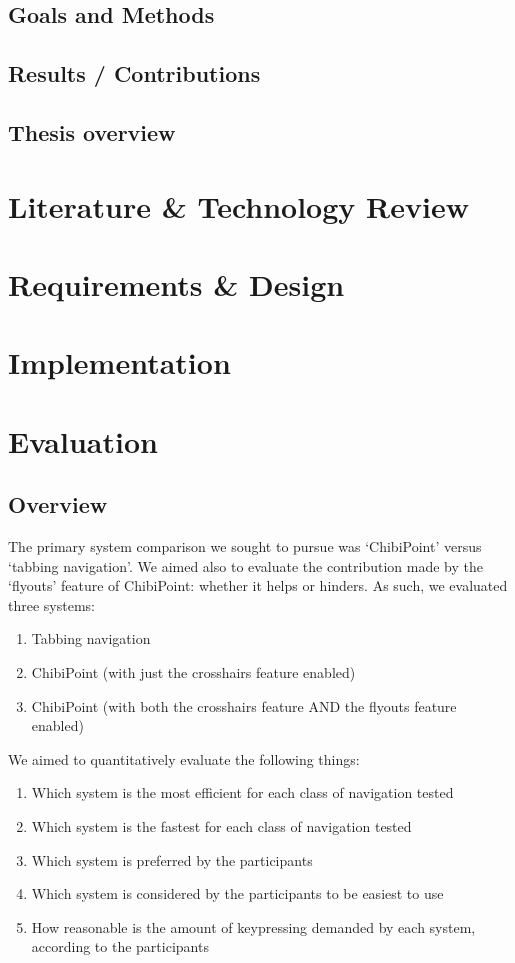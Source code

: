 \documentclass[a4paper, 12pt]{report}
\begin{document}
\section{Goals and Methods}
\section{Results / Contributions}
\section{Thesis overview}

\chapter{Literature \& Technology Review}

\chapter{Requirements \& Design}

\chapter{Implementation}

\chapter{Evaluation}
\section{Overview}
The primary system comparison we sought to pursue was `ChibiPoint' versus `tabbing navigation'. We aimed also to evaluate the contribution made by the `flyouts' feature of ChibiPoint: whether it helps or hinders. As such, we evaluated three systems:
\begin{enumerate}
\item Tabbing navigation
\item ChibiPoint (with just the crosshairs feature enabled)
\item ChibiPoint (with both the crosshairs feature AND the flyouts feature enabled)
\end{enumerate}

We aimed to quantitatively evaluate the following things:
\begin{enumerate}
\item Which system is the most efficient for each class of navigation tested
\item Which system is the fastest for each class of navigation tested
\item Which system is preferred by the participants
\item Which system is considered by the participants to be easiest to use
\item How reasonable is the amount of keypressing demanded by each system, according to the participants
\end{enumerate}
\end{document}
